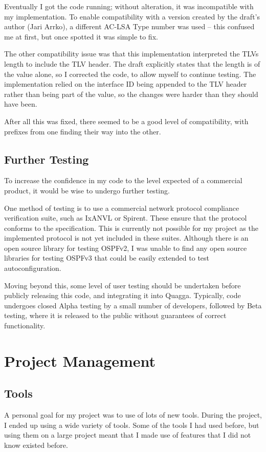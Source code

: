 \documentclass[12pt,a4paper,twoside]{report}
\begin{document}
Eventually I got the code running; without alteration, it was incompatible with
my implementation. To enable compatibility with a version created by the
draft's author (Jari Arrko), a different AC-LSA Type number was used -- this
confused me at first, but once spotted it was simple to fix.

The other compatibility issue was that this implementation interpreted the TLVs
length to include the TLV header. The draft explicitly states that the length is
of the value alone, so I corrected the code, to allow myself to continue
testing. The implementation relied on the interface ID being appended to the
TLV header rather than being part of the value, so the changes were harder than
they should have been.

After all this was fixed, there seemed to be a good level of compatibility,
with prefixes from one finding their way into the other.

\section{Further Testing}
To increase the confidence in my code to the level expected of a
commercial product, it would be wise to undergo further testing. 

One method of testing is to use a commercial network protocol compliance
verification suite, such as IxANVL or Spirent. These ensure that the protocol
conforms to the specification. This is currently not possible for my project as
the implemented protocol is not yet included in these suites.  Although there
is an open source library for testing OSPFv2, I was unable to find any open
source libraries for testing OSPFv3 that could be easily extended to test
autoconfiguration. 

Moving beyond this, some level of user testing should be undertaken before
publicly releasing this code, and integrating it into Quagga. Typically, code
undergoes closed Alpha testing by a small number of developers, followed by
Beta testing, where it is released to the public without guarantees of
correct functionality.

\chapter{Project Management}
\section{Tools}
A personal goal for my project was to use of lots of new tools. During the
project, I ended up using a wide variety of tools. Some of the tools I had used
before, but using them on a large project meant that I made use of features that
I did not know existed before.
\end{document}
